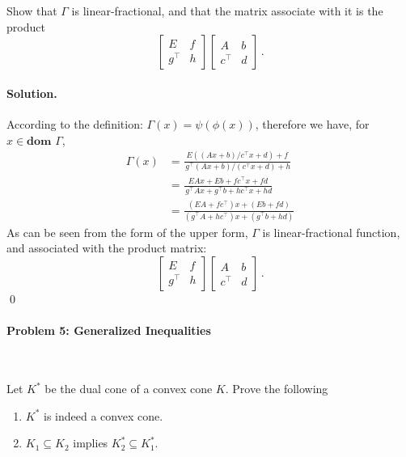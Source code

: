 \documentclass[a4paper]{article}
\newenvironment{solution}
{\color{blue} \paragraph{Solution.}}
{\newline \qed}
\begin{document}
Show that $\Gamma$ is linear-fractional, and that the matrix associate with it is the product
\begin{equation}
  \left[\begin{matrix}
   E & f \\
   g^\top & h
  \end{matrix}\right]
  \left[\begin{matrix}
   A & b \\
   c^\top & d
  \end{matrix}\right]\,.
\end{equation}


\begin{solution}
    According to the definition: $\Gamma(x)=\psi(\phi(x))$, therefore we have, for $x \in \textbf{dom } \Gamma$,
\begin{equation}\nonumber
\begin{aligned}
\Gamma(x) &= \frac{E((Ax+b)/c^\top x + d)+f}{\,g^\top(Ax+b)/(c^\top x + d) + h}\\&= \frac{EAx + Eb + fc^\top x + fd}{\,g^\top Ax + g^\top b + hc^\top x + hd}\\&= \frac{(EA + fc^\top)x + (Eb + fd)}{(g^\top A + hc^\top)x + (g^\top b + hd)}
\end{aligned}
\end{equation}
As can be seen from the form of the upper form, $\Gamma$ is linear-fractional function, and associated with the product matrix:
\begin{equation}\nonumber
  \left[\begin{matrix}
   E & f \\
   g^\top & h
  \end{matrix}\right]
  \left[\begin{matrix}
   A & b \\
   c^\top & d
  \end{matrix}\right]\,.
\end{equation}
\end{solution}

\paragraph{Problem 5: Generalized Inequalities}
~

Let $K^*$ be the dual cone of a convex cone $K$. Prove the following
\begin{enumerate}[1)]
    \item $K^*$ is indeed a convex cone.
    \item $K_1 \subseteq K_2$ implies $K_2^* \subseteq K_1^*$.
\end{enumerate}
\end{document}
